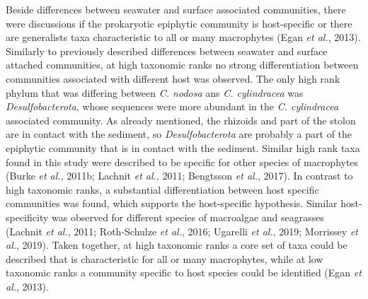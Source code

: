 \documentclass[12pt,]{article}
\begin{document}
Beside differences between seawater and surface associated communities,
there were discussions if the prokaryotic epiphytic community is
host-specific or there are generalists taxa characteristic to all or
many macrophytes (Egan \emph{et al.}, 2013). Similarly to previously
described differences between seawater and surface attached communities,
at high taxonomic ranks no strong differentiation between communities
associated with different host was observed. The only high rank phylum
that was differing between \emph{C. nodosa} ans \emph{C. cylindracea}
was \emph{Desulfobacterota}, whose sequences were more abundant in the
\emph{C. cylindracea} associated community. As already mentioned, the
rhizoids and part of the stolon are in contact with the sediment, so
\emph{Desulfobacterota} are probably a part of the epiphytic community
that is in contact with the sediment. Similar high rank taxa found in
this study were described to be specific for other species of
macrophytes (Burke \emph{et al.}, 2011b; Lachnit \emph{et al.}, 2011;
Bengtsson \emph{et al.}, 2017). In contrast to high taxonomic ranks, a
substantial differentiation between host specific communities was found,
which supports the host-specific hypothesis. Similar host-specificity
was observed for different species of macroalgae and seagrasses (Lachnit
\emph{et al.}, 2011; Roth-Schulze \emph{et al.}, 2016; Ugarelli \emph{et
al.}, 2019; Morrissey \emph{et al.}, 2019). Taken together, at high
taxonomic ranks a core set of taxa could be described that is
characteristic for all or many macrophytes, while at low taxonomic ranks
a community specific to host species could be identified (Egan \emph{et
al.}, 2013).
\end{document}
